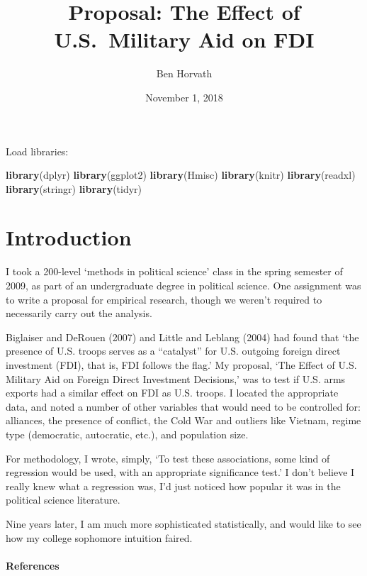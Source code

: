 \documentclass[12pt,]{article}
\title{Proposal: The Effect of U.S.~Military Aid on FDI}
\author{Ben Horvath}
\date{November 1, 2018}
\newenvironment{Shaded}{\begin{snugshade}}{\end{snugshade}}
\newcommand{\KeywordTok}[1]{\textcolor[rgb]{0.13,0.29,0.53}{\textbf{#1}}}
\newcommand{\NormalTok}[1]{#1}
\let\oldparagraph\paragraph
\renewcommand{\paragraph}[1]{\oldparagraph{#1}\mbox{}}
\begin{document}
\maketitle

Load libraries:

\begin{Shaded}
\begin{Highlighting}[]
\KeywordTok{library}\NormalTok{(dplyr)}
\KeywordTok{library}\NormalTok{(ggplot2)}
\KeywordTok{library}\NormalTok{(Hmisc)}
\KeywordTok{library}\NormalTok{(knitr)}
\KeywordTok{library}\NormalTok{(readxl)}
\KeywordTok{library}\NormalTok{(stringr)}
\KeywordTok{library}\NormalTok{(tidyr)}
\end{Highlighting}
\end{Shaded}

\hypertarget{introduction}{%
\section{Introduction}\label{introduction}}

I took a 200-level `methods in political science' class in the spring
semester of 2009, as part of an undergraduate degree in political
science. One assignment was to write a proposal for empirical research,
though we weren't required to necessarily carry out the analysis.

Biglaiser and DeRouen (2007) and Little and Leblang (2004) had found
that `the presence of U.S. troops serves as a ``catalyst'' for U.S.
outgoing foreign direct investment (FDI), that is, FDI follows the
flag.' My proposal, `The Effect of U.S. Military Aid on Foreign Direct
Investment Decisions,' was to test if U.S. arms exports had a similar
effect on FDI as U.S. troops. I located the appropriate data, and noted
a number of other variables that would need to be controlled for:
alliances, the presence of conflict, the Cold War and outliers like
Vietnam, regime type (democratic, autocratic, etc.), and population
size.

For methodology, I wrote, simply, `To test these associations, some kind
of regression would be used, with an appropriate significance test.' I
don't believe I really knew what a regression was, I'd just noticed how
popular it was in the political science literature.

Nine years later, I am much more sophisticated statistically, and would
like to see how my college sophomore intuition faired.

\hypertarget{references}{%
\paragraph{References}\label{references}}
\end{document}
